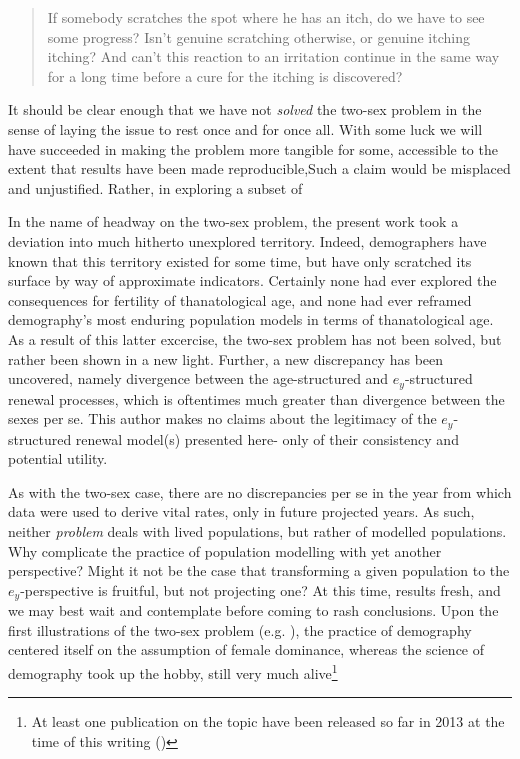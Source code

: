 \FloatBarrier

\begin{singlespace}
\begin{quote}
 If somebody scratches the spot where he has an itch, do we have to see 
 some progress? Isn't genuine scratching otherwise, or genuine itching 
itching? And can't this reaction to an irritation continue in the 
same way for a long time before a cure for the itching is discovered?
\citep{wittgenstein1984culture}
\end{quote}
\end{singlespace}

It should be clear enough that we have not \textit{solved} the two-sex problem
in the sense of laying the issue to rest once and for once all. With some
luck we will have succeeded in making the problem more tangible for some,
accessible to the extent that results have been made reproducible,Such a claim
would be misplaced and unjustified. Rather, in exploring a subset of



In the name of headway on the two-sex problem, the
present work took a deviation into much hitherto unexplored territory. Indeed,
demographers have known that this territory existed for some time, but have
only scratched its surface by way of approximate indicators. Certainly none had
ever explored the consequences for fertility of thanatological age, and none had
ever reframed demography's most enduring population models in terms of
thanatological age. As a result of this latter excercise, the two-sex problem
has not been solved, but rather been shown in a new light. Further, a new discrepancy 
has been uncovered, namely divergence between the age-structured and $e_y$-structured 
renewal processes, which is oftentimes much greater than divergence between 
the sexes per se. This author makes no claims about the legitimacy of 
the $e_y$-structured renewal model(s) presented here- only of their 
consistency and potential utility. 

As with the two-sex case, there are no
discrepancies per se in the year from which data were used to derive vital
rates, only in future projected years. As such, neither \textit{problem} deals with lived populations, but rather of
modelled populations. Why complicate the practice of population modelling with yet
another perspective? Might it not be the case that transforming a given
population to the $e_y$-perspective is fruitful, but not projecting one? At this
time, results fresh, and we may best wait and contemplate before coming to rash
conclusions. Upon the first illustrations of the two-sex problem (e.g.
\cite{kuczynski1932fertility}), the practice of demography centered itself on
the assumption of female dominance, whereas the science of demography took up
the hobby, still very much alive\footnote{At least one publication on the
topic have been released so far in 2013 at the time of this writing (\citet{Matthews2013})}



